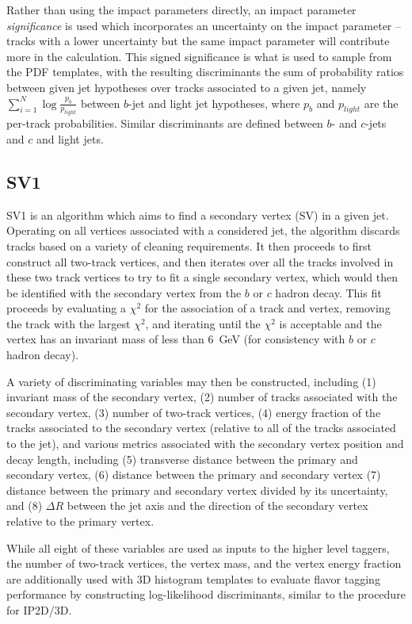 Rather than using the impact parameters directly, an impact parameter \emph{significance} is used which 
incorporates an uncertainty on the impact parameter -- tracks with a lower uncertainty but the same impact 
parameter will contribute more in the calculation. This signed significance is what is used to sample from the 
PDF templates, with the resulting discriminants the sum of probability ratios between given jet hypotheses over 
tracks associated to a given jet, namely $\sum_{i=1}^{N} \log{\frac{p_{b}}{p_{light}}}$ between $b$-jet and 
light jet hypotheses, where $p_{b}$ and $p_{light}$ are the per-track probabilities. Similar discriminants 
are defined between $b$- and $c$-jets and $c$ and light jets. 

\subsection{SV1}
SV1 is an algorithm which aims to find a secondary vertex (SV) in a given jet. Operating on all 
vertices associated with a considered jet, the algorithm discards tracks based on a variety of cleaning 
requirements. It then proceeds to first construct all two-track vertices, and then iterates over all the 
tracks involved in these two track vertices to try to fit a single secondary vertex, which would then be 
identified with the secondary vertex from the $b$ or $c$ hadron decay. This fit proceeds by evaluating 
a $\chi^2$ for the association of a track and vertex, removing the track with the largest $\chi^2$, 
and iterating until the $\chi^2$ is acceptable and the vertex has an invariant mass of less than 
\SI{6}{\GeV} (for consistency with $b$ or $c$ hadron decay).

A variety of discriminating variables may then be constructed, including (1) invariant mass of the secondary 
vertex, (2) number of tracks associated with the secondary vertex, (3) number of two-track vertices, 
(4) energy fraction of the tracks associated to the secondary vertex (relative to all of the tracks 
associated to the jet), and various metrics associated with the secondary vertex position and decay length, 
including (5) transverse distance between the primary and secondary vertex, (6) distance between the primary 
and secondary vertex (7) distance between the primary and secondary vertex divided by its uncertainty, 
and (8) $\Delta R$ between the jet axis and the direction of the secondary vertex relative to the primary
vertex.

While all eight of these variables are used as inputs to the higher level taggers, the number of two-track vertices, 
the vertex mass, and the vertex energy fraction are additionally used with 3D histogram templates to evaluate 
flavor tagging performance by constructing log-likelihood discriminants, similar to the procedure for 
IP2D/3D.

